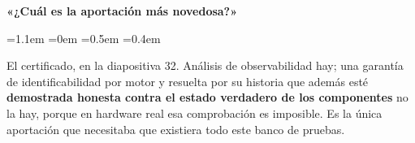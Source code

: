\documentclass[11pt,a4paper]{article}
\newenvironment{decir}%
  {\begin{list}{}{\leftmargin=1.1em \rightmargin=0em \listparindent=0pt
       \itemindent=0pt \parsep=0.5em \topsep=0.4em}\item[]\ignorespaces}%
  {\end{list}}
\begin{document}
\textbf{\color{redc}«¿Cuál es la aportación más novedosa?»}
\begin{decir}
El certificado, en la diapositiva 32. Análisis de observabilidad hay; una garantía
de identificabilidad por motor y resuelta por su historia que además esté
\textbf{demostrada honesta contra el estado verdadero de los componentes} no la
hay, porque en hardware real esa comprobación es imposible. Es la única aportación
que necesitaba que existiera todo este banco de pruebas.
\end{decir}
\end{document}
